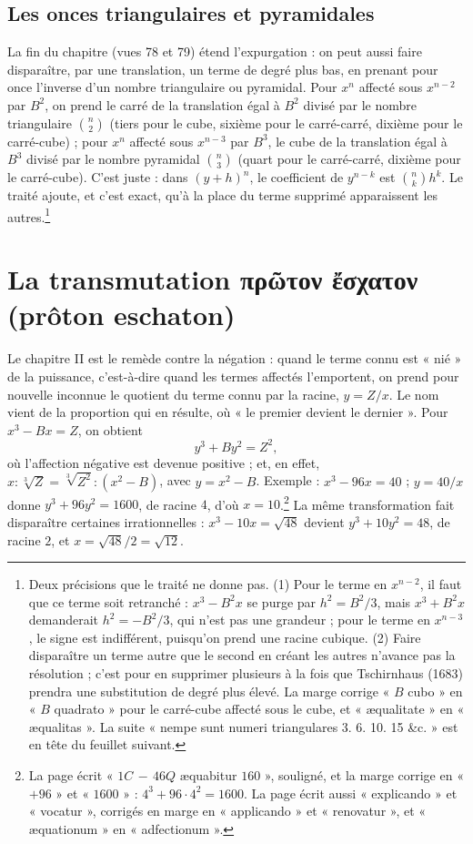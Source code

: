 \documentclass[11pt,a4paper]{article}
\begin{document}
\subsection*{Les onces triangulaires et pyramidales}

La fin du chapitre (vues 78 et 79) étend l'expurgation : on peut aussi faire
disparaître, par une translation, un terme de degré plus bas, en prenant pour
once l'inverse d'un nombre triangulaire ou pyramidal. Pour $x^n$ affecté sous
$x^{n-2}$ par $B^2$, on prend le carré de la translation égal à $B^2$ divisé par
le nombre triangulaire $\binom{n}{2}$ (tiers pour le cube, sixième pour le
carré-carré, dixième pour le carré-cube) ; pour $x^n$ affecté sous $x^{n-3}$ par
$B^3$, le cube de la translation égal à $B^3$ divisé par le nombre pyramidal
$\binom{n}{3}$ (quart pour le carré-carré, dixième pour le carré-cube). C'est
juste : dans $(y + h)^n$, le coefficient de $y^{n-k}$ est $\binom{n}{k}h^k$. Le
traité ajoute, et c'est exact, qu'à la place du terme supprimé apparaissent les
autres.\footnote{Deux précisions que le traité ne donne pas. (1) Pour le terme
en $x^{n-2}$, il faut que ce terme soit retranché : $x^3 - B^2x$ se purge par
$h^2 = B^2/3$, mais $x^3 + B^2x$ demanderait $h^2 = -B^2/3$, qui n'est pas une
grandeur ; pour le terme en $x^{n-3}$, le signe est indifférent, puisqu'on
prend une racine cubique. (2) Faire disparaître un terme autre que le second en
créant les autres n'avance pas la résolution ; c'est pour en supprimer plusieurs
à la fois que Tschirnhaus (1683) prendra une substitution de degré plus élevé.
La marge corrige « $B$ cubo » en « $B$ quadrato » pour le carré-cube affecté sous le
cube, et « æqualitate » en « æqualitas ». La suite « nempe sunt numeri
triangulares 3. 6. 10. 15 \&c. » est en tête du feuillet suivant.}

\section*{La transmutation πρῶτον ἔσχατον (prôton eschaton)}

Le chapitre II est le remède contre la négation : quand le terme connu est
« nié » de la puissance, c'est-à-dire quand les termes affectés l'emportent, on
prend pour nouvelle inconnue le quotient du terme connu par la racine,
$y = Z/x$. Le nom vient de la proportion qui en résulte, où « le premier devient
le dernier ». Pour $x^3 - Bx = Z$, on obtient
\[ y^3 + By^2 = Z^2 , \]
où l'affection négative est devenue positive ; et, en effet,
$x : \sqrt[3]{Z} = \sqrt[3]{Z^2} : (x^2 - B)$, avec $y = x^2 - B$. Exemple :
$x^3 - 96x = 40$ ; $y = 40/x$ donne $y^3 + 96y^2 = 1600$, de racine $4$, d'où
$x = 10$.\footnote{La page écrit « $1C \,-\, 46Q$ æquabitur $160$ », souligné, et la
marge corrige en « $+ 96$ » et « $1600$ » : $4^3 + 96 \cdot 4^2 = 1600$. La page écrit
aussi « explicando » et « vocatur », corrigés en marge en « applicando » et
« renovatur », et « æquationum » en « adfectionum ».} La même transformation
fait disparaître certaines irrationnelles : $x^3 - 10x = \sqrt{48}$ devient
$y^3 + 10y^2 = 48$, de racine $2$, et $x = \sqrt{48}/2 = \sqrt{12}$.
\end{document}
